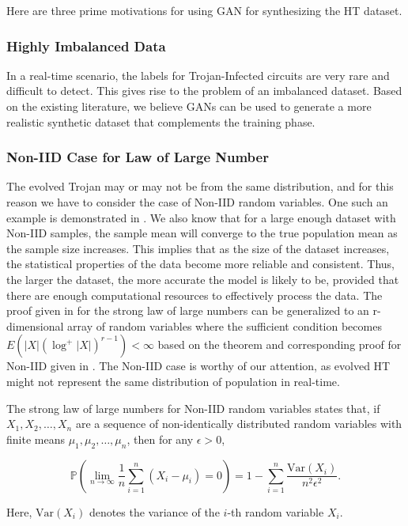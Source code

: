 Here are three prime motivations for using GAN for synthesizing the HT dataset. 

\subsubsection*{Highly Imbalanced Data} In a real-time scenario, the labels for Trojan-Infected circuits are very rare and difficult to detect. This gives rise to the problem of an imbalanced dataset. Based on the existing literature, we believe GANs can be used to generate a more realistic synthetic dataset that complements the training phase.

\subsubsection*{Non-IID Case for Law of Large Number} The evolved Trojan may or may not be from the same distribution, and for this reason we have to consider the case of Non-IID random variables. One such an example is demonstrated in \cite{yonetani2019decentralized}. We also know that for a large enough dataset with Non-IID samples, the sample mean will converge to the true population mean as the sample size increases. This implies that as the size of the dataset increases, the statistical properties of the data become more reliable and consistent. Thus, the larger the dataset, the more accurate the model is likely to be, provided that there are enough computational resources to effectively process the data. The proof given in \cite{etemadi1981elementary} for the strong law of large numbers can be generalized to an r-dimensional array of random variables where the sufficient condition becomes $E\left(|X|\left(\log ^{+}|X|\right)^{r-1}\right)<\infty$ based on the theorem and corresponding proof for Non-IID given in \cite{smythe1973strong}. The Non-IID case is worthy of our attention, as evolved HT might not represent the same distribution of population in real-time.

\iffalse 

\begin{theorem}
\label{llm}
The strong law of large numbers for Non-IID random variables states that, if $X_1, X_2, \ldots, X_n$ are a sequence of non-identically distributed random variables with finite means $\mu_1, \mu_2, \ldots, \mu_n$, then for any $\epsilon > 0$,

\begin{equation*}
\mathbb{P} \left( \lim_{n \to \infty} \frac{1}{n} \sum_{i=1}^n (X_i - \mu_i) = 0 \right) = 1 - \sum_{i=1}^n \frac{\mathrm{Var}(X_i)}{n^2 \epsilon^2}.
\end{equation*}

Here, $\mathrm{Var}(X_i)$ denotes the variance of the $i$-th random variable $X_i$.
\end{theorem}

